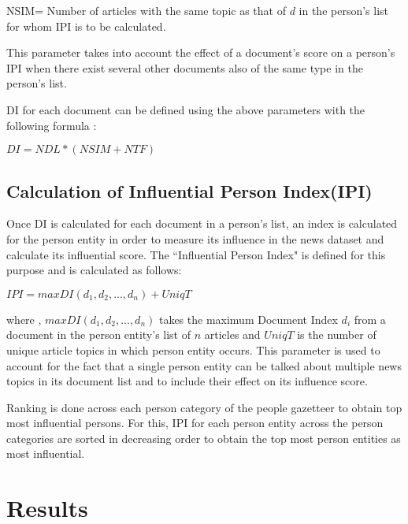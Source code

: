 \begin{description}
NSIM= Number of articles with the same topic as that of $d$ in the person's list for whom IPI is to be calculated.

This parameter takes into account the effect of a document's score on a person's IPI when there exist several other documents also of the same type in the person's list. 

\end{description}


DI for each document can be defined using the above parameters with the following formula :


			$DI = NDL *	(  NSIM + NTF )$


\subsection{Calculation of Influential Person Index(IPI)}

Once DI is calculated for each document in a person's list, an index is calculated for the person entity in order to measure its influence in the news dataset and calculate its influential score. The ``Influential Person Index" is defined for this purpose and is calculated as follows:
		

$IPI= max DI(d_1, d_2, ...,d_n)+ UniqT$

where , $max DI(d_1, d_2, ...,d_n)$ takes the maximum Document Index $d_i$ from a document in the person entity's list of  $n$ articles 
and $UniqT$ is the number of unique article topics in which person entity occurs. This parameter is used to account for the fact that a single person entity can be talked about multiple news topics in its document list and to include their effect on its influence score.

Ranking is done across each person category of the people gazetteer to obtain top most influential persons. For this, IPI for each person entity across the person categories are sorted in decreasing order to obtain the top most person entities as most influential.
  


\section{Results}
\label{influential:results}

